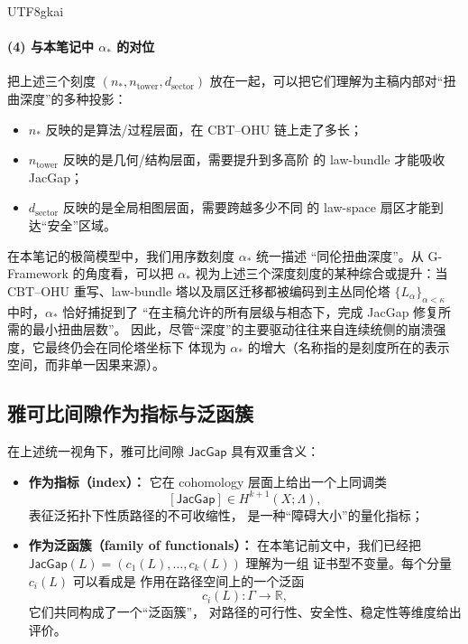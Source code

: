 \documentclass[12pt]{article}
\newcommand{\JacGap}{\mathsf{JacGap}}
\begin{document}
\begin{CJK*}{UTF8}{gkai}
\paragraph{(4) 与本笔记中 $\alpha_\ast$ 的对位}

把上述三个刻度 $(n_\ast,n_{\mathrm{tower}},d_{\mathrm{sector}})$
放在一起，可以把它们理解为主稿内部对“扭曲深度”的多种投影：
\begin{itemize}
  \item $n_\ast$ 反映的是算法/过程层面，在 CBT--OHU 链上走了多长；
  \item $n_{\mathrm{tower}}$ 反映的是几何/结构层面，需要提升到多高阶
        的 law-bundle 才能吸收 JacGap；
  \item $d_{\mathrm{sector}}$ 反映的是全局相图层面，需要跨越多少不同
        的 law-space 扇区才能到达“安全”区域。
\end{itemize}

在本笔记的极简模型中，我们用序数刻度 $\alpha_\ast$ 统一描述
“同伦扭曲深度”。从 G-Framework 的角度看，可以把 $\alpha_\ast$
视为上述三个深度刻度的某种综合或提升：当 CBT--OHU 重写、law-bundle
塔以及扇区迁移都被编码到主丛同伦塔
$\{L_\alpha\}_{\alpha<\kappa}$ 中时，$\alpha_\ast$ 恰好捕捉到了
“在主稿允许的所有层级与相态下，完成 JacGap 修复所需的最小扭曲层数”。
因此，尽管“深度”的主要驱动往往来自连续统侧的崩溃强度，它最终仍会在同伦塔坐标下
体现为 $\alpha_\ast$ 的增大（名称指的是刻度所在的表示空间，而非单一因果来源）。

\subsection{雅可比间隙作为指标与泛函簇}

在上述统一视角下，雅可比间隙 $\JacGap$ 具有双重含义：
\begin{itemize}
  \item \textbf{作为指标（index）：}
        它在 cohomology 层面上给出一个上同调类
        \[
          [\JacGap]\in H^{k+1}(X;\Lambda),
        \]
        表征泛拓扑下性质路径的不可收缩性，
        是一种“障碍大小”的量化指标；
  \item \textbf{作为泛函簇（family of functionals）：}
        在本笔记前文中，我们已经把
        $\JacGap(L)=(c_1(L),\dots,c_k(L))$ 理解为一组
        证书型不变量。每个分量 $c_i(L)$ 可以看成是
        作用在路径空间上的一个泛函
        \[
          c_i(L):\Gamma\longrightarrow\mathbb{R},
        \]
        它们共同构成了一个“泛函簇”，
        对路径的可行性、安全性、稳定性等维度给出评价。
\end{itemize}


\end{CJK*}
\end{document}

